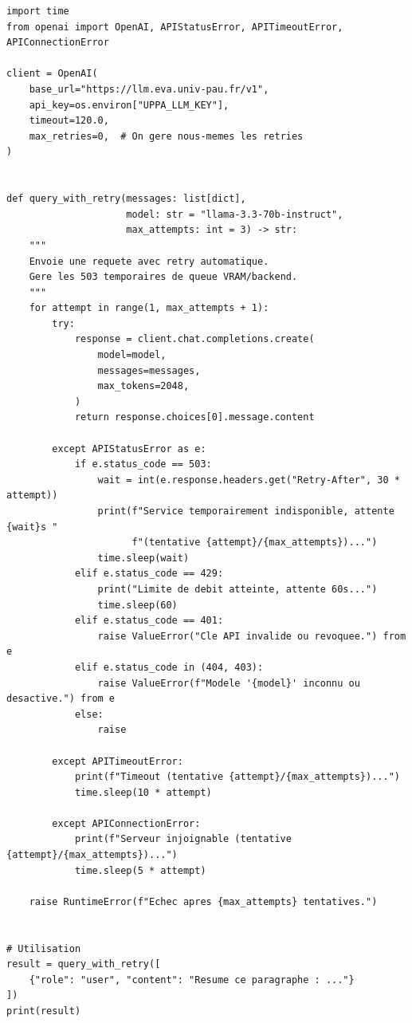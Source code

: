 \documentclass[12pt, a4paper, twoside]{article}
\begin{document}
\begin{lstlisting}[style=pythonstyle, caption={Requête avec retry automatique et gestion des erreurs}]
import time
from openai import OpenAI, APIStatusError, APITimeoutError, APIConnectionError

client = OpenAI(
    base_url="https://llm.eva.univ-pau.fr/v1",
    api_key=os.environ["UPPA_LLM_KEY"],
    timeout=120.0,
    max_retries=0,  # On gere nous-memes les retries
)


def query_with_retry(messages: list[dict],
                     model: str = "llama-3.3-70b-instruct",
                     max_attempts: int = 3) -> str:
    """
    Envoie une requete avec retry automatique.
    Gere les 503 temporaires de queue VRAM/backend.
    """
    for attempt in range(1, max_attempts + 1):
        try:
            response = client.chat.completions.create(
                model=model,
                messages=messages,
                max_tokens=2048,
            )
            return response.choices[0].message.content

        except APIStatusError as e:
            if e.status_code == 503:
                wait = int(e.response.headers.get("Retry-After", 30 * attempt))
                print(f"Service temporairement indisponible, attente {wait}s "
                      f"(tentative {attempt}/{max_attempts})...")
                time.sleep(wait)
            elif e.status_code == 429:
                print("Limite de debit atteinte, attente 60s...")
                time.sleep(60)
            elif e.status_code == 401:
                raise ValueError("Cle API invalide ou revoquee.") from e
            elif e.status_code in (404, 403):
                raise ValueError(f"Modele '{model}' inconnu ou desactive.") from e
            else:
                raise

        except APITimeoutError:
            print(f"Timeout (tentative {attempt}/{max_attempts})...")
            time.sleep(10 * attempt)

        except APIConnectionError:
            print(f"Serveur injoignable (tentative {attempt}/{max_attempts})...")
            time.sleep(5 * attempt)

    raise RuntimeError(f"Echec apres {max_attempts} tentatives.")


# Utilisation
result = query_with_retry([
    {"role": "user", "content": "Resume ce paragraphe : ..."}
])
print(result)
\end{lstlisting}

\end{document}
